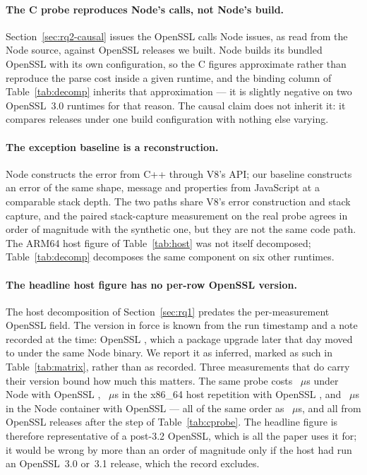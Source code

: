 \documentclass[pdflatex,sn-basic,twocolumn]{sn-jnl}%
\begin{document}
\paragraph{The C probe reproduces Node's calls, not Node's build.}
Section~\ref{sec:rq2-causal} issues the OpenSSL calls Node issues, as read from
the Node source, against OpenSSL releases we built. Node builds its bundled
OpenSSL with its own configuration, so the C figures approximate rather than
reproduce the parse cost inside a given runtime, and the binding column of
Table~\ref{tab:decomp} inherits that approximation --- it is slightly negative
on two OpenSSL~3.0 runtimes for that reason. The causal claim does not inherit
it: it compares releases under one build configuration with nothing else
varying.

\paragraph{The exception baseline is a reconstruction.} Node constructs the
error from C++ through V8's API; our baseline constructs an error of the same
shape, message and properties from JavaScript at a comparable stack depth. The
two paths share V8's error construction and stack capture, and the paired
stack-capture measurement on the real probe agrees in order of magnitude with
the synthetic one, but they are not the same code path. The ARM64 host figure
of Table~\ref{tab:host} was not itself decomposed; Table~\ref{tab:decomp}
decomposes the same component on six other runtimes.

\paragraph{The headline host figure has no per-row OpenSSL version.} The host
decomposition of Section~\ref{sec:rq1} predates the per-measurement OpenSSL
field. The version in force is known from the run timestamp and a note recorded
at the time: OpenSSL \HostOpensslInferred, which a package upgrade later that
day moved to \HostOpensslAfterDrift{} under the same Node binary. We report it
as inferred, marked as such in Table~\ref{tab:matrix}, rather than as recorded.
Three measurements that do carry their version bound how much this matters.
The same probe costs \RtTwentySixProbe~$\mu$s under Node \RtTwentySixLiteral{}
with OpenSSL \RtTwentySixOpenssl, \XhProbeThrows~$\mu$s in the x86\_64 host
repetition with OpenSSL \XhOpenssl, and \NodeTwentySixGlibcProbeThrows~$\mu$s in
the Node \NodeTwentySixGlibcNodeMajor{} container with OpenSSL
\NodeTwentySixGlibcOpensslLiteral{} --- all of the same order as
\HostProbeThrows~$\mu$s, and all from OpenSSL releases after the step of
Table~\ref{tab:cprobe}. The headline figure is therefore representative of a
post-3.2 OpenSSL, which is all the paper uses it for; it would be wrong by more
than an order of magnitude only if the host had run an OpenSSL~3.0 or~3.1
release, which the record excludes.
\end{document}

